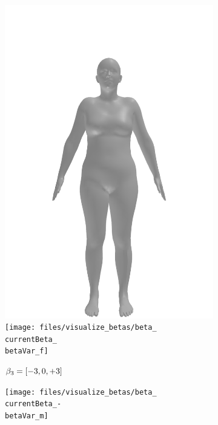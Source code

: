 \begin{figure}[ht!]
\begin{subfigure}{\betaWidth}
        \includegraphics[width=\imgWidth]{files/visualize_betas/baseline_f}
        \texttt{[image: files/visualize\_betas/beta\_\\currentBeta\_\\betaVar\_f]}
        \caption{$\beta_3 = [-3, 0, +3]$}
    \end{subfigure}
    \begin{subfigure}{\betaWidth}
        \def\currentBeta{3}
        \centering
        \texttt{[image: files/visualize\_betas/beta\_\\currentBeta\_-\\betaVar\_m]}

\end{subfigure}
\end{figure}
